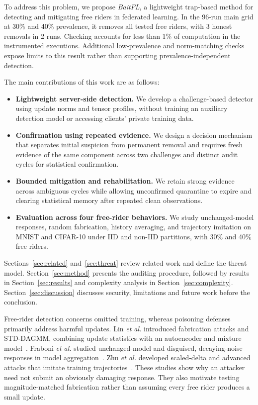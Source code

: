 \documentclass[journal]{IEEEtran}
\makeatletter
\renewcommand{\section}{\@startsection{section}{1}{\z@}{1.5ex}{0.7ex}{\normalfont\normalsize\centering\scshape}}
\makeatother
\begin{document}
To address this problem, we propose \emph{BaitFL}, a lightweight trap-based
method for detecting and mitigating free riders in federated learning.
In the 96-run main grid at 30\% and 40\% prevalence,
it removes all tested free riders,
with 3 honest removals in 2 runs. Checking
accounts for less than 1\% of computation in the instrumented executions.
Additional low-prevalence and norm-matching checks expose limits to this
result rather than supporting prevalence-independent detection.

\noindent The main contributions of this work are as follows:
\begin{itemize} %
\item \textbf{Lightweight server-side detection.} We develop a challenge-based
detector using update norms and tensor profiles, without training an auxiliary
detection model or accessing clients' private training data.
\item \textbf{Confirmation using repeated evidence.} We design a decision
mechanism that separates initial suspicion from permanent removal and requires
fresh evidence of the same component across two challenges and distinct audit
cycles for statistical confirmation.
\item \textbf{Bounded mitigation and rehabilitation.} We retain strong evidence
across ambiguous cycles while allowing unconfirmed quarantine to expire and
clearing statistical memory after repeated clean observations.
\item \textbf{Evaluation across four free-rider behaviors.} We study unchanged-model
responses, random fabrication, history averaging, and trajectory imitation on
MNIST and CIFAR-10 under IID and non-IID partitions, with 30\% and 40\% free riders.
\end{itemize}

Sections~\ref{sec:related} and~\ref{sec:threat} review related work and
define the threat model. Section~\ref{sec:method} presents the auditing
procedure, followed by results in Section~\ref{sec:results} and complexity
analysis in Section~\ref{sec:complexity}. Section~\ref{sec:discussion}
discusses security, limitations and future work before the conclusion.

\section{Literature Review}\label{sec:related}
Free-rider detection concerns omitted training, whereas poisoning
defenses primarily address harmful updates. Lin \emph{et al.} introduced
fabrication attacks and STD-DAGMM, combining update statistics with an
autoencoder and mixture model~\cite{lin2019freeriders,zong2018dagmm}.
Fraboni \emph{et al.} studied unchanged-model and disguised, decaying-noise
responses in model aggregation~\cite{fraboni2021freerider}. Zhu \emph{et al.}
developed scaled-delta and advanced attacks that imitate training
trajectories~\cite{zhu2021advanced}. These studies show why an attacker
need not submit an obviously damaging response. They also motivate
testing magnitude-matched fabrication rather than assuming every free
rider produces a small update.
\end{document}

